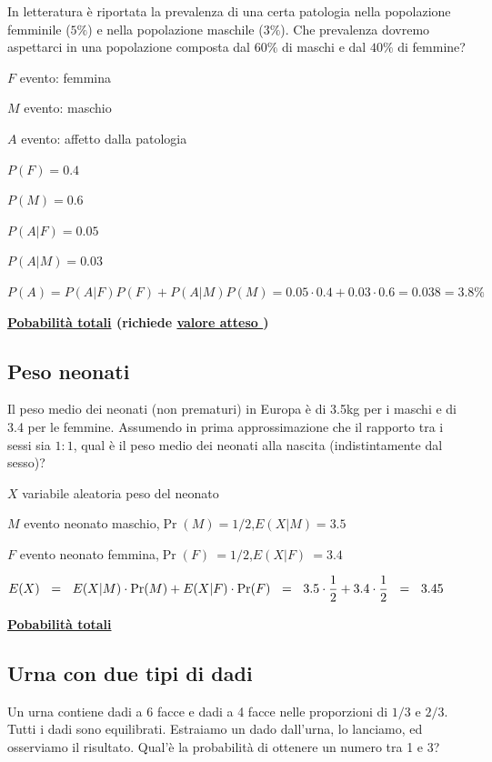 \documentclass[11pt,openany]{book}
\begin{document}
In letteratura è riportata la prevalenza di una certa patologia nella popolazione femminile ($5\%$) e nella popolazione maschile ($3\%$). Che prevalenza dovremo aspettarci in una popolazione composta dal $60\%$ di maschi e dal $40\%$ di femmine?

$F$ evento: femmina

$M$ evento: maschio

$A$ evento: affetto dalla patologia

$P(F)=0.4$

$P(M)=0.6$

$P(A|F)=0.05$

$P(A|M)=0.03$

$P(A)=P(A|F)P(F)+P(A|M)P(M)=0.05\cdot0.4+0.03\cdot0.6=0.038=3.8\%$


\clearpage
\hfill\textbf{{\color{brown}\hyperref[TeoremaProbabilitaTotaliMedia]{Pobabilità totali} \faShare} (richiede \hyperref[ValoreAtteso]{valore atteso \faShare})}
\subsection{Peso neonati}
\label{Neonati_totali}

Il peso medio dei neonati (non prematuri) in Europa è di 3.5kg per i maschi e di 3.4 per le femmine. Assumendo in prima approssimazione che il rapporto tra i sessi sia $1:1$, qual è il peso medio dei neonati alla nascita (indistintamente dal sesso)?

$X$ variabile aleatoria peso del neonato

$M$ evento neonato maschio,\quad $\Pr(M)=1/2$,\quad $E(X|M)=3.5$

$F$ evento neonato femmina,\quad $\Pr(F)\ =1/2$,\quad $E(X|F)\ =3.4$


$E(X)\medrel{=}E(X|M)\cdot\Pr(M)+ E(X|F)\cdot\Pr(F)\medrel{=}3.5\cdot\dfrac12 + 3.4\cdot\dfrac12\medrel{=}3.45$


\clearpage
\hfill\textbf{{\color{brown}\hyperref[TeoremaProbabilitaTotali]{Pobabilità totali} \faShare}}
\subsection{Urna con due tipi di dadi}
\label{dadi_diversi}

Un urna contiene dadi a 6 facce e dadi a 4 facce nelle proporzioni di $1/3$ e $2/3$.
Tutti i dadi sono equilibrati.
Estraiamo un dado dall'urna, lo lanciamo, ed osserviamo il risultato.
Qual'è la probabilità di ottenere un numero tra 1 e 3?
\end{document}

